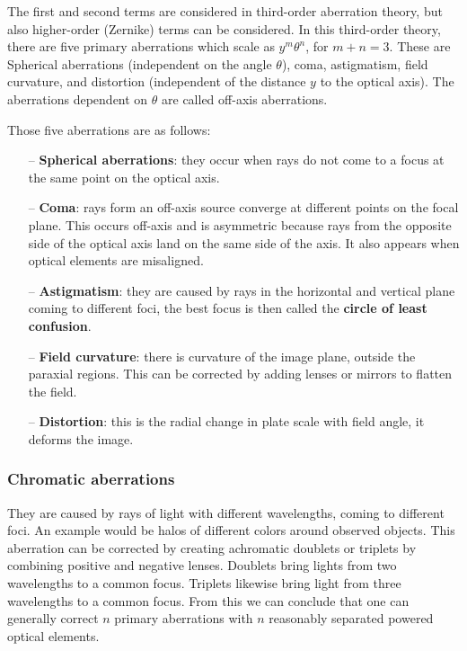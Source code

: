 \documentclass[a4paper]{article}
\begin{document}
The first and second terms are considered in third-order aberration theory, but also higher-order (Zernike) terms can be considered. In this third-order theory, there are five primary aberrations which scale as $y^m\theta^n$, for $m+n=3$. These are Spherical aberrations (independent on the angle $\theta$), coma, astigmatism, field curvature, and distortion (independent of the distance $y$ to the optical axis). The aberrations dependent on $\theta$ are called off-axis aberrations. 

\bigskip

Those five aberrations are as follows:

\begin{enumerate}
    \item[--] \textbf{Spherical aberrations}: they occur when rays do not come to a focus at the same point on the optical axis.
    \item[--] \textbf{Coma}: rays form an off-axis source converge at different points on the focal plane. This occurs off-axis and is asymmetric because rays from the opposite side of the optical axis land on the same side of the axis. It also appears when optical elements are misaligned.
    \item[--] \textbf{Astigmatism}: they are caused by rays in the horizontal and vertical plane coming to different foci, the best focus is then called the \textbf{circle of least confusion}.
    \item[--] \textbf{Field curvature}: there is curvature of the image plane, outside the paraxial regions. This can be corrected by adding lenses or mirrors to flatten the field.
    \item[--] \textbf{Distortion}: this is the radial change in plate scale with field angle, it deforms the image.
\end{enumerate}

\subsubsection*{Chromatic aberrations}

They are caused by rays of light with different wavelengths, coming to different foci. An example would be halos of different colors around observed objects. This aberration can be corrected by creating achromatic doublets or triplets by combining positive and negative lenses. Doublets bring lights from two wavelengths to a common focus. Triplets likewise bring light from three wavelengths to a common focus. From this we can conclude that one can generally correct $n$ primary aberrations with $n$ reasonably separated powered optical elements. 
\end{document}
